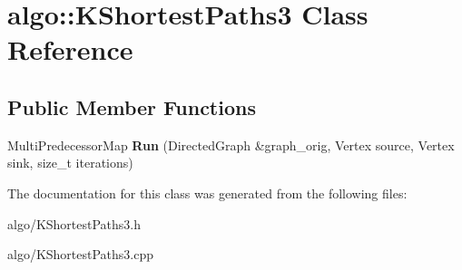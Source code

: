 \hypertarget{classalgo_1_1KShortestPaths3}{}\section{algo\+:\+:K\+Shortest\+Paths3 Class Reference}
\label{classalgo_1_1KShortestPaths3}
\subsection*{Public Member Functions}
\begin{DoxyCompactItemize}
\item 
Multi\+Predecessor\+Map {\bfseries Run} (Directed\+Graph \&graph\+\_\+orig, Vertex source, Vertex sink, size\+\_\+t iterations)\hypertarget{classalgo_1_1KShortestPaths3_af58f8d42e14b0eba96191a3122db311a}{}\label{classalgo_1_1KShortestPaths3_af58f8d42e14b0eba96191a3122db311a}

\end{DoxyCompactItemize}


The documentation for this class was generated from the following files\+:\begin{DoxyCompactItemize}
\item 
algo/K\+Shortest\+Paths3.\+h\item 
algo/K\+Shortest\+Paths3.\+cpp\end{DoxyCompactItemize}
